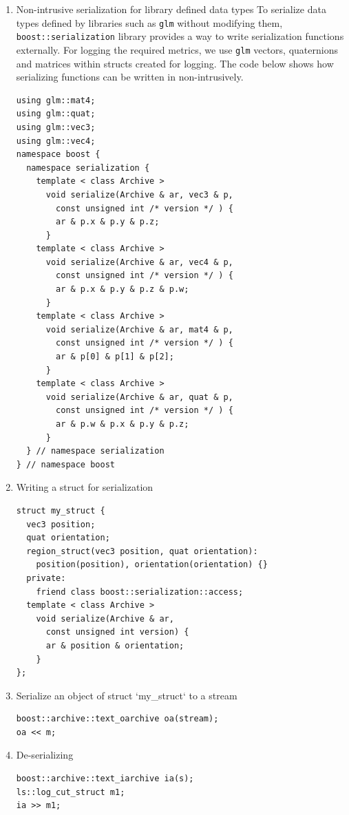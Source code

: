\begin{enumerate}
    \item Non-intrusive serialization for library defined data types
    To serialize data types defined by libraries such as \texttt{glm} without modifying them, \texttt{boost::serialization} library provides a way to write serialization functions externally. For logging the required metrics, we use \texttt{glm} vectors, quaternions and matrices within structs created for logging. The code below shows how serializing functions can be written in non-intrusively.
    \begin{lstlisting}[style=CStyle]
using glm::mat4;
using glm::quat;
using glm::vec3;
using glm::vec4;
namespace boost {
  namespace serialization {
    template < class Archive >
      void serialize(Archive & ar, vec3 & p,
        const unsigned int /* version */ ) {
        ar & p.x & p.y & p.z;
      }
    template < class Archive >
      void serialize(Archive & ar, vec4 & p,
        const unsigned int /* version */ ) {
        ar & p.x & p.y & p.z & p.w;
      }
    template < class Archive >
      void serialize(Archive & ar, mat4 & p,
        const unsigned int /* version */ ) {
        ar & p[0] & p[1] & p[2];
      }
    template < class Archive >
      void serialize(Archive & ar, quat & p,
        const unsigned int /* version */ ) {
        ar & p.w & p.x & p.y & p.z;
      }
  } // namespace serialization
} // namespace boost
    \end{lstlisting}
    \item Writing a struct for serialization
    \begin{lstlisting}[style=CStyle]
struct my_struct {
  vec3 position;
  quat orientation;
  region_struct(vec3 position, quat orientation):
    position(position), orientation(orientation) {}
  private:
    friend class boost::serialization::access;
  template < class Archive >
    void serialize(Archive & ar,
      const unsigned int version) {
      ar & position & orientation;
    }
};
    \end{lstlisting}
    \item Serialize an object of struct `my\_struct` to a stream
    \begin{lstlisting}[style=CStyle]
boost::archive::text_oarchive oa(stream);
oa << m;
    \end{lstlisting}
    \item De-serializing
    \begin{lstlisting}[style=CStyle]
boost::archive::text_iarchive ia(s);
ls::log_cut_struct m1;
ia >> m1;
    \end{lstlisting}
\end{enumerate}

